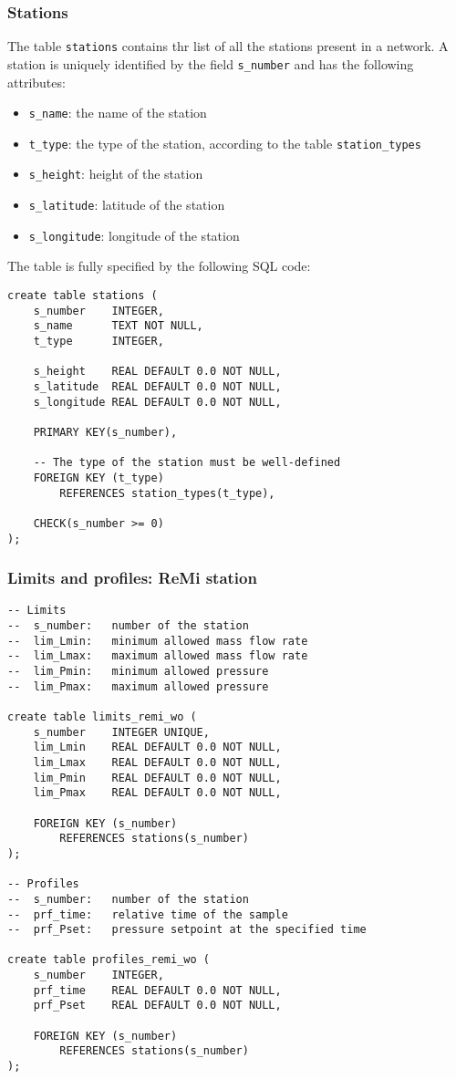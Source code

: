 \documentclass[10pt]{article}
\begin{document}
\subsubsection{Stations}
The table \texttt{stations} contains thr list of all the stations present in a
network. A station is uniquely identified by the field \texttt{s\_number} and has
the following attributes:
\begin{itemize}
    \item \texttt{s\_name}: the name of the station
    \item \texttt{t\_type}: the type of the station, according to the table \texttt{station\_types} 
    \item \texttt{s\_height}: height of the station
    \item \texttt{s\_latitude}: latitude of the station
    \item \texttt{s\_longitude}: longitude of the station
\end{itemize}

The table is fully specified by the following SQL code:
\begin{verbatim}
create table stations (
    s_number    INTEGER,
    s_name      TEXT NOT NULL,
    t_type      INTEGER,

    s_height    REAL DEFAULT 0.0 NOT NULL,
    s_latitude  REAL DEFAULT 0.0 NOT NULL,
    s_longitude REAL DEFAULT 0.0 NOT NULL,

    PRIMARY KEY(s_number),
    
    -- The type of the station must be well-defined
    FOREIGN KEY (t_type)
        REFERENCES station_types(t_type),
    
    CHECK(s_number >= 0)
);
\end{verbatim}

\subsubsection{Limits and profiles: ReMi station}

\begin{verbatim}
-- Limits
--  s_number:   number of the station
--  lim_Lmin:   minimum allowed mass flow rate
--  lim_Lmax:   maximum allowed mass flow rate
--  lim_Pmin:   minimum allowed pressure
--  lim_Pmax:   maximum allowed pressure

create table limits_remi_wo (
    s_number    INTEGER UNIQUE,
    lim_Lmin    REAL DEFAULT 0.0 NOT NULL,
    lim_Lmax    REAL DEFAULT 0.0 NOT NULL,
    lim_Pmin    REAL DEFAULT 0.0 NOT NULL,
    lim_Pmax    REAL DEFAULT 0.0 NOT NULL,

    FOREIGN KEY (s_number)
        REFERENCES stations(s_number)
);

-- Profiles
--  s_number:   number of the station
--  prf_time:   relative time of the sample
--  prf_Pset:   pressure setpoint at the specified time

create table profiles_remi_wo (
    s_number    INTEGER,
    prf_time    REAL DEFAULT 0.0 NOT NULL,
    prf_Pset    REAL DEFAULT 0.0 NOT NULL,

    FOREIGN KEY (s_number)
        REFERENCES stations(s_number)
);
\end{verbatim}
\end{document}
